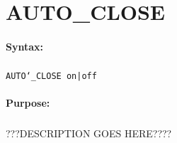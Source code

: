 
\newpage
\section{AUTO\_CLOSE}
\label{cmd:AUTO\_CLOSE}

\paragraph{Syntax:}
\subparagraph{}
\texttt{AUTO\char`\_CLOSE on|off}

\paragraph{Purpose:}
\subparagraph{}
???DESCRIPTION GOES HERE????